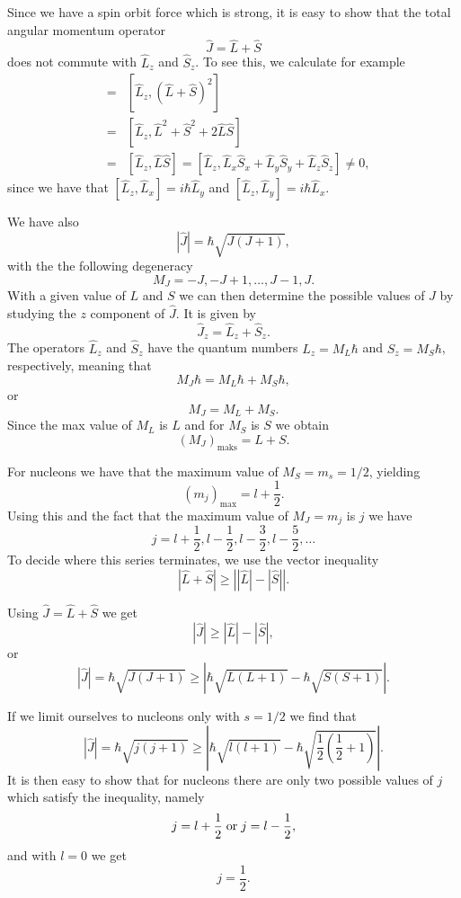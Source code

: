 \documentclass[graybox,sectrefs,envcountresetchap,open=right]{svmonodo}
\begin{document}
Since we have a spin orbit force which is strong, it is easy to show that 
the total angular momentum operator
\[
   \hat{J}=\hat{L}+\hat{S}
\]
does not commute with $\hat{L}_z$ and $\hat{S}_z$. To see this, we calculate for example
\begin{eqnarray} 
   [\hat{L}_z,\hat{J}^2]&=&[\hat{L}_z,(\hat{L}+\hat{S})^2] \\ \nonumber
   &=&[\hat{L}_z,\hat{L}^2+\hat{S}^2+2\hat{L}\hat{S}]\\ \nonumber 
   &=& [\hat{L}_z,\hat{L}\hat{S}]=[\hat{L}_z,\hat{L}_x\hat{S}_x+\hat{L}_y\hat{S}_y+\hat{L}_z\hat{S}_z]\ne 0, 
\end{eqnarray}
since we have that $[\hat{L}_z,\hat{L}_x]=i\hbar\hat{L}_y$ and $[\hat{L}_z,\hat{L}_y]=i\hbar\hat{L}_x$. 

We have also
\[
   |\hat{J}|=\hbar\sqrt{J(J+1)},
\]
with the the following degeneracy
\[
   M_J=-J, -J+1, \dots, J-1, J.
\]
With a given value of  $L$ and $S$ we can then determine the possible values of 
 $J$ by studying the $z$ component of  $\hat{J}$. 
It is given by
\[
\hat{J}_z=\hat{L}_z+\hat{S}_z.
\]
The operators $\hat{L}_z$ and $\hat{S}_z$ have the quantum numbers
$L_z=M_L\hbar$ and $S_z=M_S\hbar$, respectively, meaning that
\[
   M_J\hbar=M_L\hbar +M_S\hbar,
\]
or
\[
   M_J=M_L +M_S.
\]
Since the max value of  $M_L$ is $L$ and for  $M_S$ is $S$
we obtain
\[
   (M_J)_{\mathrm{maks}}=L+S.
\]

For nucleons we have that the maximum value of $M_S=m_s=1/2$, yielding
\[
   (m_j)_{\mathrm{max}}=l+\frac{1}{2}.
\]
Using this and the fact that the maximum value of  $M_J=m_j$ is $j$ we have
\[
   j=l+\frac{1}{2}, l-\frac{1}{2}, l-\frac{3}{2}, l-\frac{5}{2}, \dots 
\]
To decide where this series terminates, we use the vector inequality
\[
   |\hat{L}+\hat{S}| \ge \left| |\hat{L}|-|\hat{S}|\right|.
\]

Using $\hat{J}=\hat{L}+\hat{S}$ we get 
\[
   |\hat{J}| \ge |\hat{L}|-|\hat{S}|,
\]
or
\[
   |\hat{J}|=\hbar\sqrt{J(J+1)}\ge |\hbar\sqrt{L(L+1)}-
   \hbar\sqrt{S(S+1)}|.
\]

If we limit ourselves to nucleons only with $s=1/2$ we find that
\[
   |\hat{J}|=\hbar\sqrt{j(j+1)}\ge |\hbar\sqrt{l(l+1)}-
   \hbar\sqrt{\frac{1}{2}(\frac{1}{2}+1)}|.
\]
It is then easy to show that for nucleons there are only two possible values of
$j$ which satisfy the inequality, namely
\[
   j=l+\frac{1}{2}\hspace{0.1cm} \mathrm{or} \hspace{0.1cm}j=l-\frac{1}{2},
\]
and with $l=0$ we get 
\[
   j=\frac{1}{2}.
\]
\end{document}
